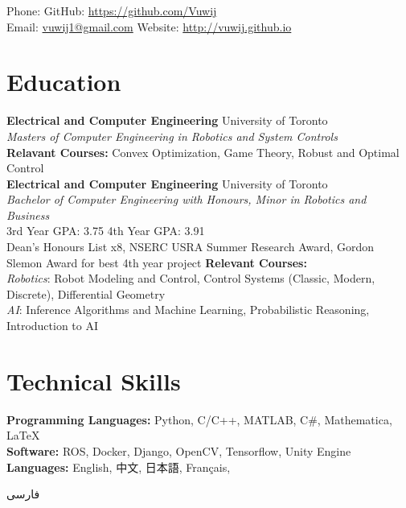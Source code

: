 \documentclass[11pt, a4paper]{cv}
\renewcommand*{\name}{\fontsize{24}{40}\mdseries\upshape}
\begin{document}
\begin{center}
\name{Jason Wang}
\end{center}


Phone: \texttt{} \hfill
GitHub: \href{https://github.com/Vuwij}{https://github.com/Vuwij}\\
Email: \href{mailto:vuwij1@gmail.com}{vuwij1@gmail.com}\hfill
Website: \href{http://vuwij.github.io}{http://vuwij.github.io}

\section*{Education}
\textbf{Electrical and Computer Engineering}
\hfill University of Toronto\\
\emph{Masters of Computer Engineering in Robotics and System Controls}\\
\small{\textbf{Relavant Courses:} Convex Optimization, Game Theory, Robust and Optimal Control}\\

\textbf{Electrical and Computer Engineering} \hfill University of Toronto\\
\emph{Bachelor of Computer Engineering with Honours, Minor in Robotics and Business}\\
\small{
	3rd Year GPA: 3.75\hspace{1em}
	4th Year GPA: 3.91\hspace{1em}\\
Dean's Honours List x8, NSERC USRA Summer Research Award, Gordon Slemon Award for best 4th year project
}
\small{\textbf{Relevant Courses:} \\
	\textit{Robotics}: Robot Modeling and Control, Control Systems (Classic, Modern, Discrete), Differential Geometry\\
	\textit{AI}: Inference Algorithms and Machine Learning, Probabilistic Reasoning, Introduction to AI}


\section*{Technical Skills}
\textbf{Programming Languages:} Python, C/C++, MATLAB, C\#, Mathematica, \LaTeX\\[0.2em]
\textbf{Software:} ROS, Docker, Django, OpenCV, Tensorflow, Unity Engine\\[0.2em]
\textbf{Languages:} English, 中文, 日本語, Français, \begin{farsi}فارسی\end{farsi}
\end{document}
